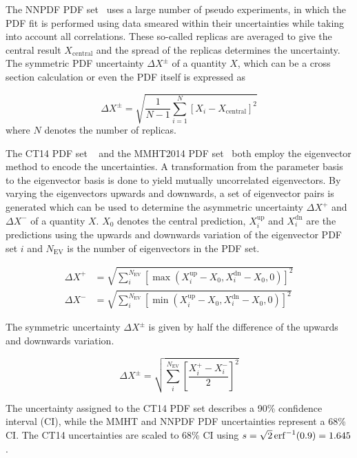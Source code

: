 The NNPDF PDF set~\cite{Ball:2014uwa} uses a large number of pseudo experiments, in which the PDF
fit is performed using data smeared within their uncertainties while taking into
account all correlations. These so-called replicas are averaged to give the
central result $X_\mathrm{central}$ and the spread of the replicas determines the uncertainty. The
symmetric PDF uncertainty $\Delta X^\pm$ of a quantity $X$, which can be a cross section calculation or
even the PDF itself is expressed as

\begin{equation*}
    \Delta X^{\pm} = \sqrt{\frac{1}{N-1} \sum_{i=1}^N \left[ X_{i} - X_{\mathrm{central}} \right]^2}
\end{equation*}
where $N$ denotes the number of replicas.

The CT14 PDF set ~\cite{Dulat:2015mca} and the MMHT2014 PDF
set~\cite{Harland-Lang:2014zoa} both employ the eigenvector method to encode the
uncertainties. A transformation from the parameter basis to the eigenvector
basis is done to yield mutually uncorrelated eigenvectors. By varying the
eigenvectors upwards and downwards, a set of eigenvector pairs is generated
which can be used to determine the asymmetric uncertainty $\Delta X^+$ and
$\Delta X^-$ of a quantity $X$. $X_0$ denotes the central prediction,
$X_i^{\mathrm{up}}$ and $X_i^{\mathrm{dn}}$ are the predictions using the
upwards and downwards variation of the eigenvector PDF set $i$ and
$N_{\mathrm{EV}}$ is the number of eigenvectors in the PDF set.

\begin{equation*}
\begin{aligned}
    \Delta X^+ &= \sqrt{\sum_i^{N_{\mathrm{EV}}} \left[ \max(X_i^{\mathrm{up}}
    -X_0, X_i^{\mathrm{dn}} - X_0, 0)\right]^2}\\
\Delta X^- &= \sqrt{\sum_i^{N_{\mathrm{EV}}} \left[ \min(X_i^{\mathrm{up}} - X_0, X_i^{\mathrm{dn}} - X_0,0)\right]^2}
\end{aligned}
\end{equation*}

The symmetric uncertainty $\Delta X^{\pm}$ is given by half the difference of the upwards and
downwards variation.

\begin{equation*}
    \Delta X^{\pm} = \sqrt{\sum_i^{N_{\mathrm{EV}}} \left[ \frac{X_i^+ -
    X_i^-}{2} \right]^2}
\end{equation*}

The uncertainty assigned to the CT14 PDF set describes a 90\% confidence
interval (CI), while the MMHT and NNPDF PDF uncertainties represent a 68\% CI.
The CT14 uncertainties are scaled to 68\% CI using $s = \sqrt{2}
\operatorname{erf}^{-1}(0.9) = 1.645$.

